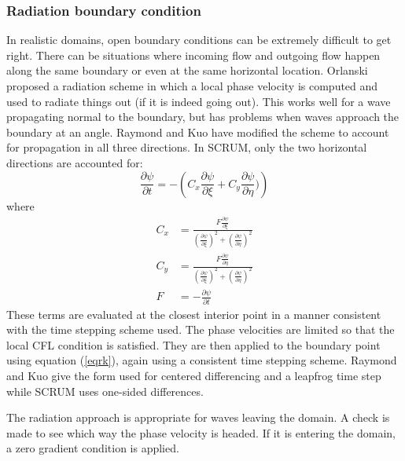 \subsubsection{Radiation boundary condition}
In realistic domains, open boundary conditions can be extremely
difficult to get right. There can be situations where incoming flow and
outgoing flow happen along the same boundary or even at the same
horizontal location. Orlanski \cite{Orlanski76} proposed a radiation
scheme in which a local phase velocity is computed and used to radiate
things out (if it is indeed going out). This works well for a wave
propagating normal to the boundary, but has problems when waves
approach the boundary at an angle. Raymond and Kuo \cite{Raymond84}
have modified the scheme to account for propagation in all three
directions. In SCRUM, only the two horizontal directions are accounted
for:
\begin{equation}
   \frac{\partial \psi}{\partial t} = - \left( C_x \frac{\partial
   \psi}{\partial \xi} + C_y \frac{\partial \psi}{\partial \eta}) \right)
\label{eqrk}
\end{equation}
where
\begin{align}
   C_x & = \frac{F \frac{\partial \psi}{\partial \xi}}{
   \left( \frac{\partial \psi}{\partial \xi} \right)^2 +
   \left( \frac{\partial \psi}{\partial \eta} \right)^2 } \\
   C_y & = \frac{F \frac{\partial \psi}{\partial \eta}}{
   \left( \frac{\partial \psi}{\partial \xi} \right)^2 +
   \left( \frac{\partial \psi}{\partial \eta} \right)^2 } \\
   F & = - \frac{\partial \psi}{\partial t}
\end{align}
These terms are evaluated at the closest interior point in a manner
consistent with the time stepping scheme used. The phase velocities are
limited so that the local CFL condition is satisfied. They are then
applied to the boundary point using equation (\ref{eqrk}), again using
a consistent time stepping scheme. Raymond and Kuo give the form used
for centered differencing and a leapfrog time step while SCRUM uses
one-sided differences.

The radiation approach is appropriate for waves leaving the domain. A
check is made to see which way the phase velocity is headed. If it is
entering the domain, a zero gradient condition is applied.
